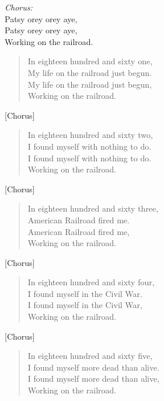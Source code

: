 
\begin{center}
\textit{Chorus:} \\
Patsy orey orey aye, \\
Patsy orey orey aye, \\
Working on the railroad. \\
\end{center}

\begin{verse}
In eighteen hundred and sixty one, \\
My life on the railroad just begun. \\
My life on the railroad just begun, \\
Working on the railroad. \\
\end{verse}

[Chorus]

\begin{verse}
In eighteen hundred and sixty two, \\
I found myself with nothing to do. \\
I found myself with nothing to do. \\
Working on the railroad. \\
\end{verse}

[Chorus]

\begin{verse}
In eighteen hundred and sixty three, \\
American Railroad fired me. \\
American Railroad fired me, \\
Working on the railroad. \\
\end{verse}

[Chorus]

\begin{verse}
In eighteen hundred and sixty four, \\
I found myself in the Civil War. \\
I found myself in the Civil War, \\
Working on the railroad. \\
\end{verse}

[Chorus]

\begin{verse}
In eighteen hundred and sixty five, \\
I found myself more dead than alive. \\
I found myself more dead than alive, \\
Working on the railroad. \\
\end{verse}


